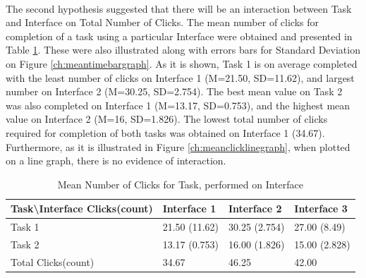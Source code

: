 \documentclass{l4proj}
\begin{document}
{\paragraph{}
The second hypothesis suggested that there will be an interaction between Task and Interface on Total Number of Clicks. The mean number of clicks for completion of a task using a particular Interface were obtained and presented in Table \ref{tab:clickspertaskandinterface}. These were also illustrated along with errors bars for Standard Deviation on Figure \ref{ch:meantimebargraph}. As it is shown, Task 1 is on average completed with the least number of clicks on Interface 1 (M=21.50, SD=11.62), and largest number on Interface 2 (M=30.25, SD=2.754). The best mean value on Task 2 was also completed on Interface 1 (M=13.17, SD=0.753), and the highest mean value on Interface 2 (M=16, SD=1.826). The lowest total number of clicks required for completion of both tasks was obtained on Interface 1 (34.67). Furthermore, as it is illustrated in Figure \ref{ch:meanclicklinegraph}, when plotted on a line graph, there is no evidence of interaction. 


\begin{table}[H]
	\centering
	\begin{tabular}{|l|l|l|l|} \hline
		Task\textbackslash Interface Clicks(count)&	Interface 1	& Interface 2 &	Interface 3 \\ \hline
		Task 1 	& 21.50 (11.62)	& 30.25 (2.754)	& 27.00 (8.49)  \\ \hline
		Task 2	& 13.17 (0.753)	& 16.00 (1.826)	& 15.00 (2.828)  \\ \hline
		Total Clicks(count)	& 34.67	& 46.25 & 42.00 \\ \hline
	\end{tabular}
	\caption{Mean Number of Clicks for Task, performed on Interface}
	\label{tab:clickspertaskandinterface}
\end{table}

}
\end{document}
